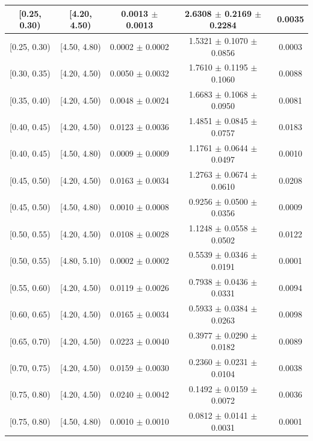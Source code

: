 \begin{longtable}{|c|c|c|c|c|}
\hline
\endlastfoot
[0.25, 0.30) & [4.20, 4.50) & 0.0013 $\pm$ 0.0013 & 2.6308 $\pm$ 0.2169 $\pm$ 0.2284 & 0.0035 \\ 
\hline
[0.25, 0.30) & [4.50, 4.80) & 0.0002 $\pm$ 0.0002 & 1.5321 $\pm$ 0.1070 $\pm$ 0.0856 & 0.0003 \\ 
\hline
[0.30, 0.35) & [4.20, 4.50) & 0.0050 $\pm$ 0.0032 & 1.7610 $\pm$ 0.1195 $\pm$ 0.1060 & 0.0088 \\ 
\hline
[0.35, 0.40) & [4.20, 4.50) & 0.0048 $\pm$ 0.0024 & 1.6683 $\pm$ 0.1068 $\pm$ 0.0950 & 0.0081 \\ 
\hline
[0.40, 0.45) & [4.20, 4.50) & 0.0123 $\pm$ 0.0036 & 1.4851 $\pm$ 0.0845 $\pm$ 0.0757 & 0.0183 \\ 
\hline
[0.40, 0.45) & [4.50, 4.80) & 0.0009 $\pm$ 0.0009 & 1.1761 $\pm$ 0.0644 $\pm$ 0.0497 & 0.0010 \\ 
\hline
[0.45, 0.50) & [4.20, 4.50) & 0.0163 $\pm$ 0.0034 & 1.2763 $\pm$ 0.0674 $\pm$ 0.0610 & 0.0208 \\ 
\hline
[0.45, 0.50) & [4.50, 4.80) & 0.0010 $\pm$ 0.0008 & 0.9256 $\pm$ 0.0500 $\pm$ 0.0356 & 0.0009 \\ 
\hline
[0.50, 0.55) & [4.20, 4.50) & 0.0108 $\pm$ 0.0028 & 1.1248 $\pm$ 0.0558 $\pm$ 0.0502 & 0.0122 \\ 
\hline
[0.50, 0.55) & [4.80, 5.10) & 0.0002 $\pm$ 0.0002 & 0.5539 $\pm$ 0.0346 $\pm$ 0.0191 & 0.0001 \\ 
\hline
[0.55, 0.60) & [4.20, 4.50) & 0.0119 $\pm$ 0.0026 & 0.7938 $\pm$ 0.0436 $\pm$ 0.0331 & 0.0094 \\ 
\hline
[0.60, 0.65) & [4.20, 4.50) & 0.0165 $\pm$ 0.0034 & 0.5933 $\pm$ 0.0384 $\pm$ 0.0263 & 0.0098 \\ 
\hline
[0.65, 0.70) & [4.20, 4.50) & 0.0223 $\pm$ 0.0040 & 0.3977 $\pm$ 0.0290 $\pm$ 0.0182 & 0.0089 \\ 
\hline
[0.70, 0.75) & [4.20, 4.50) & 0.0159 $\pm$ 0.0030 & 0.2360 $\pm$ 0.0231 $\pm$ 0.0104 & 0.0038 \\ 
\hline
[0.75, 0.80) & [4.20, 4.50) & 0.0240 $\pm$ 0.0042 & 0.1492 $\pm$ 0.0159 $\pm$ 0.0072 & 0.0036 \\ 
\hline
[0.75, 0.80) & [4.50, 4.80) & 0.0010 $\pm$ 0.0010 & 0.0812 $\pm$ 0.0141 $\pm$ 0.0031 & 0.0001 \\ 
\hline
\end{longtable}
